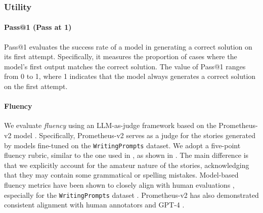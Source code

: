 \subsubsection{Utility}
\label{app:metrics_utility}

\paragraph{Pass@1 (Pass at 1)}
Pass@1 evaluates the success rate of a model in generating a correct solution on its first attempt. Specifically, it measures the proportion of cases where the model's first output matches the correct solution. The value of Pass@1 ranges from 0 to 1, where 1 indicates that the model always generates a correct solution on the first attempt. 

\paragraph{Fluency} We evaluate \textit{fluency} using an LLM-as-judge framework \citep{zheng2024judging} based on the Prometheus-v2 model \citep{kim2024prometheus}. Specifically, Prometheus-v2 serves as a judge for the stories generated by models fine-tuned on the \texttt{WritingPrompts} dataset. We adopt a five-point fluency rubric, similar to the one used in \citep{fu2023gptscore, chen2024copybench}, as shown in . The main difference is that we explicitly account for the amateur nature of the stories, acknowledging that they may contain some grammatical or spelling mistakes. Model-based fluency metrics have been shown to closely align with human evaluations \citep{liu2023g, sottana2023evaluation}, especially for the \texttt{WritingPrompts} dataset \citep{chiang2023can}. Prometheus-v2 has also demonstrated consistent alignment with human annotators and GPT-4 \citep{kim2024prometheus}.

